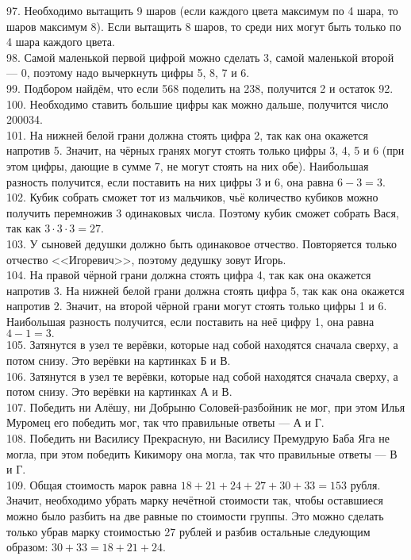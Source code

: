 97. Необходимо вытащить 9 шаров (если каждого цвета максимум по 4 шара, то шаров максимум 8). Если вытащить 8 шаров, то среди них могут быть только по 4 шара каждого цвета.\\
98. Самой маленькой первой цифрой можно сделать 3, самой маленькой второй --- 0, поэтому надо вычеркнуть цифры 5, 8, 7 и 6.\\
99. Подбором найдём, что если 568 поделить на 238, получится 2 и остаток 92.\\
100. Необходимо ставить большие цифры как можно дальше, получится число 200034.\\
101. На нижней белой грани должна стоять цифра 2, так как она окажется напротив 5. Значит, на чёрных гранях могут стоять только цифры 3, 4, 5 и 6 (при этом цифры, дающие в сумме 7, не могут стоять на них обе). Наибольшая разность получится, если поставить на них цифры 3 и 6, она равна $6-3=3.$\\
102. Кубик собрать сможет тот из мальчиков, чьё количество кубиков можно получить перемножив 3 одинаковых числа. Поэтому кубик сможет собрать Вася, так как $3\cdot3\cdot3=27.$\\
103. У сыновей дедушки должно быть одинаковое отчество. Повторяется только отчество <<Игоревич>>, поэтому дедушку зовут Игорь.\\
104. На правой чёрной грани должна стоять цифра 4, так как она окажется напротив 3. На нижней белой грани должна стоять цифра 5, так как она окажется напротив 2. Значит, на второй чёрной грани могут стоять только цифры 1 и 6. Наибольшая разность получится, если поставить на неё цифру 1, она равна $4-1=3.$\\
105. Затянутся в узел те верёвки, которые над собой находятся сначала сверху, а потом снизу. Это верёвки на картинках Б и В.\\
106. Затянутся в узел те верёвки, которые над собой находятся сначала сверху, а потом снизу. Это верёвки на картинках А и В.\\
107. Победить ни Алёшу, ни Добрыню Соловей-разбойник не мог, при этом Илья Муромец его победить мог, так что правильные ответы --- А и Г.\\
108. Победить ни Василису Прекрасную, ни Василису Премудрую Баба Яга не могла, при этом победить Кикимору она могла, так что правильные ответы --- В и Г.\\
109. Общая стоимость марок равна $18+21+24+27+30+33=153$ рубля. Значит, необходимо убрать марку нечётной стоимости так, чтобы оставшиеся можно было разбить на две равные по стоимости группы. Это можно сделать только убрав марку стоимостью 27 рублей и разбив остальные следующим образом: $30+33=18+21+24.$\\
